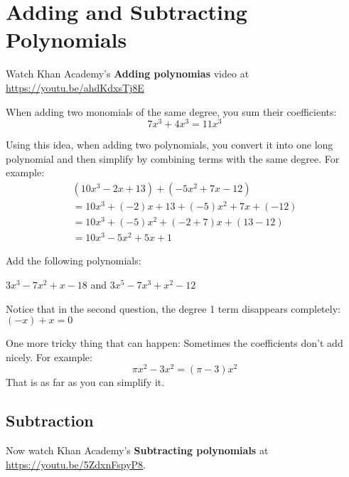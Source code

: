\chapter{Adding and Subtracting Polynomials}

Watch Khan Academy's \textbf{Adding polynomias} video at \url{https://youtu.be/ahdKdxsTj8E}

When adding two monomials of the same degree, you sum their coefficients:
\begin{equation*}
  7x^3 + 4x^3 = 11x^3
\end{equation*}

Using this idea, when adding two polynomials, you convert it into one long
polynomial and then simplify by combining terms with the same degree. For example:
\begin{multline*}
  (10x^3 - 2x + 13) + (-5x^2 + 7x -12) \\
  = 10x^3 + (-2)x + 13 + (-5)x^2 + 7x + (-12) \\
  = 10x^3 + (-5)x^2 + (-2 + 7)x + (13 - 12) \\
  = 10x^3 - 5x^2 + 5x + 1
\end{multline*}

\begin{Exercise}[title=Adding Polynomials Practice, label=addpns]
  Add the following polynomials:
  \vspace{20mm}
  \vspace{20mm}
\end{Exercise}
\begin{Answer}[ref=addpns]$3x^3 - 7x^2 + x - 18$ and $3x^5 - 7x^3 + x^2 - 12$\end{Answer}

Notice that in the second question, the degree 1 term disappears completely: $(-x) + x = 0$

One more tricky thing that can happen: Sometimes the coefficients don't add nicely.  For example:
\begin{equation*}
  \pi x^2 - 3 x^2 = (\pi - 3) x^2
\end{equation*}
That is as far as you can simplify it.
    
\section{Subtraction}

Now watch Khan Academy's \textbf{Subtracting polynomials} at \url{https://youtu.be/5ZdxnFspyP8}.

